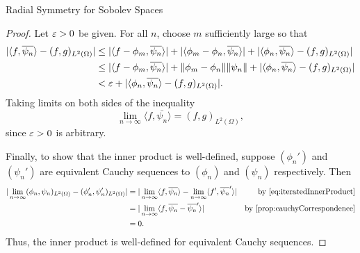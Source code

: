\begin{chapter}{Radial Symmetry for Sobolev Spaces}
\begin{proof}
Let $\varepsilon > 0$ be given. 
For all $n$, choose $m$ sufficiently large so that
\begin{align}
  |\langle f,\overline{\psi_n}\rangle - (f,g)_{L^2(\Omega)}| 
    &\le |\langle f - \phi_m,\overline{\psi_n}\rangle| + |\langle \phi_m - \phi_n, \overline{\psi_n}\rangle| + |\langle \phi_n,\overline{\psi_n}\rangle - (f,g)_{L^2(\Omega)}| \nonumber\\
    &\le |\langle f - \phi_m,\overline{\psi_n}\rangle| + \| \phi_m - \phi_n\| \|\psi_n\| + |\langle \phi_n,\overline{\psi_n}\rangle - (f,g)_{L^2(\Omega)}| \nonumber\\
    &< \varepsilon +|\langle \phi_n,\overline{\psi_n}\rangle - (f,g)_{L^2(\Omega)}|.
\end{align}
Taking limits on both sides of the inequality 
\begin{equation} \label{eq:iteratedInnerProduct}
  \lim_{n\to\infty} \langle f,\bar{\psi_n}\rangle = (f,g)_{L^2(\Omega)}, 
\end{equation}
since $\varepsilon>0$ is arbitrary.

Finally, to show that the inner product is well-defined, suppose $(\phi_n')$ and $(\psi_n')$ are equivalent Cauchy sequences to $(\phi_n)$ and $(\psi_n)$ respectively.
Then
\begin{align}
  |\lim_{n\to\infty}(\phi_n,\psi_n)_{L^2(\Omega)} - (\phi_n',\psi_n')_{L^2(\Omega)}| 
  &= |\lim_{n\to\infty}\langle f,\bar{\psi_n}\rangle - \lim_{n\to\infty}\langle f',\bar{\psi_n}'\rangle| &\text{by \eqref{eq:iteratedInnerProduct}}\nonumber\\
  &= |\lim_{n\to\infty}\langle f,\bar{\psi_n} - \bar{\psi_n}'\rangle| &\text{by \Cref{prop:cauchyCorrespondence}}\nonumber \\
  &= 0 \nonumber.
\end{align}
Thus, the inner product is well-defined for equivalent Cauchy sequences.
\end{proof}


\end{chapter}
